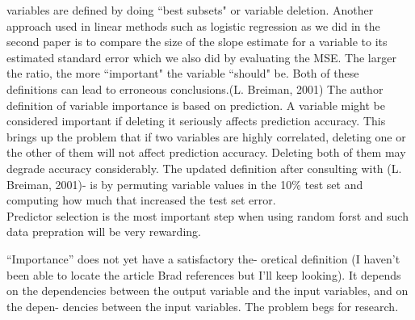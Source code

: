 \documentclass[journal]{/home/hoofar/LatexClasses/IEEEtran}
\begin{document}
variables are defined by doing ``best subsets" or variable deletion.
Another approach used in linear methods such as
logistic regression as we did in the second paper is to compare the size of the slope estimate for a variable to
its estimated standard error which we also did by evaluating the MSE. The larger the ratio,
the more ``important" the variable ``should" be. Both of these definitions can lead to erroneous conclusions.(L. Breiman, 2001)
The author definition of variable importance is based
on prediction. A variable might be considered
important if deleting it seriously affects prediction
accuracy. This brings up the problem that if two
variables are highly correlated, deleting one or the
other of them will not affect prediction accuracy.
Deleting both of them may degrade accuracy considerably. The updated definition after consulting with (L. Breiman, 2001)- is by permuting variable values in the 10\% test set and computing how much
that increased the test set error. \\ Predictor selection is the most important step when using random forst and such data prepration will be very rewarding.

“Importance” does not yet have a satisfactory the-
oretical definition (I haven’t been able to locate the
article Brad references but I’ll keep looking). It
depends on the dependencies between the output
variable and the input variables, and on the depen-
dencies between the input variables. The problem
begs for research.
\end{document}

